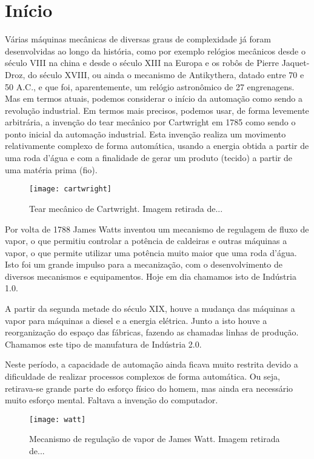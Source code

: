 

\section{Início}
Várias máquinas mecânicas de diversas graus de complexidade já foram desenvolvidas ao longo da história, como por exemplo relógios mecânicos desde o século VIII na china e desde o século XIII na Europa e os robôs de Pierre Jaquet-Droz, do século XVIII, ou ainda o mecanismo de Antikythera, datado entre 70 e 50 A.C., e que foi, aparentemente, um relógio astronômico de 27 engrenagens. Mas em termos atuais, podemos considerar o início da automação como sendo a revolução industrial. Em termos mais precisos, podemos usar, de forma levemente arbitrária, a invenção do tear mecânico por Cartwright em 1785 como sendo o ponto inicial da automação industrial. Esta invenção realiza um movimento relativamente complexo de forma automática, usando a energia obtida a partir de uma roda d'água e com a finalidade de gerar um produto (tecido) a partir de uma matéria prima (fio).
\begin{figure}
  \centering
  \texttt{[image: cartwright]}
  \caption{Tear mecânico de Cartwright. Imagem retirada de...}
\end{figure}

Por volta de 1788 James Watts inventou um mecanismo de regulagem de fluxo de vapor, o que permitiu controlar a potência de caldeiras e outras máquinas a vapor, o que permite utilizar uma potência muito maior que uma roda d'água. Isto foi um grande impulso para a mecanização, com o desenvolvimento de diversos mecanismos e equipamentos. Hoje em dia chamamos isto de Indústria 1.0.

A partir da segunda metade do século XIX, houve a mudança das máquinas a vapor para máquinas a diesel e a energia elétrica. Junto a isto houve a reorganização do espaço das fábricas, fazendo as chamadas linhas de produção. Chamamos este tipo de manufatura de Indústria 2.0.

Neste período, a capacidade de automação ainda ficava muito restrita devido a dificuldade de realizar processos complexos de forma automática. Ou seja, retirava-se grande parte do esforço físico do homem, mas ainda era necessário muito esforço mental. Faltava a invenção do computador.

\begin{figure}
  \centering
  \texttt{[image: watt]}
  \caption{Mecanismo de regulação de vapor de James Watt. Imagem retirada de...}
\end{figure}

